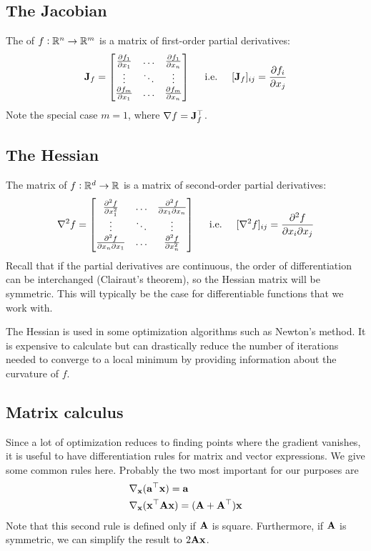 \subsection{The Jacobian}
The  of $f : \mathbb{R}^n \to \mathbb{R}^m$ is a matrix of first-order partial derivatives:
\[\mathbf{J}_f = \begin{bmatrix}
	\pdv{f_1}{x_1} & \hdots & \pdv{f_1}{x_n} \\
	\vdots & \ddots & \vdots \\
	\pdv{f_m}{x_1} & \hdots & \pdv{f_m}{x_n}\end{bmatrix}
\hspace{0.5cm}\text{i.e.}\hspace{0.5cm}
[\mathbf{J}_f]_{ij} = \pdv{f_i}{x_j}\]
Note the special case $m = 1$, where $\nabla f = \mathbf{J}_f^\top$.

\subsection{The Hessian}
The  matrix of $f : \mathbb{R}^d \to \mathbb{R}$ is a matrix of second-order partial derivatives:
\[\nabla^2 f = \begin{bmatrix}
	\pdv[2]{f}{x_1} & \hdots & \pdv{f}{x_1}{x_n} \\
	\vdots & \ddots & \vdots \\
	\pdv{f}{x_n}{x_1} & \hdots & \pdv[2]{f}{x_n}\end{bmatrix}
\hspace{0.5cm}\text{i.e.}\hspace{0.5cm}
[\nabla^2 f]_{ij} = {\pdv{f}{x_i}{x_j}}\]
Recall that if the partial derivatives are continuous, the order of differentiation can be interchanged (Clairaut's theorem), so the Hessian matrix will be symmetric.
This will typically be the case for differentiable functions that we work with.

The Hessian is used in some optimization algorithms such as Newton's method.
It is expensive to calculate but can drastically reduce the number of iterations needed to converge to a local minimum by providing information about the curvature of $f$.

\subsection{Matrix calculus}
Since a lot of optimization reduces to finding points where the gradient vanishes, it is useful to have differentiation rules for matrix and vector expressions.
We give some common rules here.
Probably the two most important for our purposes are
\begin{align*}
\nabla_{\mathbf{x}} &(\mathbf{a}^\top\mathbf{x}) = \mathbf{a} \\
\nabla_{\mathbf{x}} &(\mathbf{x}^\top\mathbf{A}\mathbf{x}) = (\mathbf{A} + \mathbf{A}^\top)\mathbf{x}
\end{align*}
Note that this second rule is defined only if $\mathbf{A}$ is square.
Furthermore, if $\mathbf{A}$ is symmetric, we can simplify the result to $2\mathbf{A}\mathbf{x}$.

